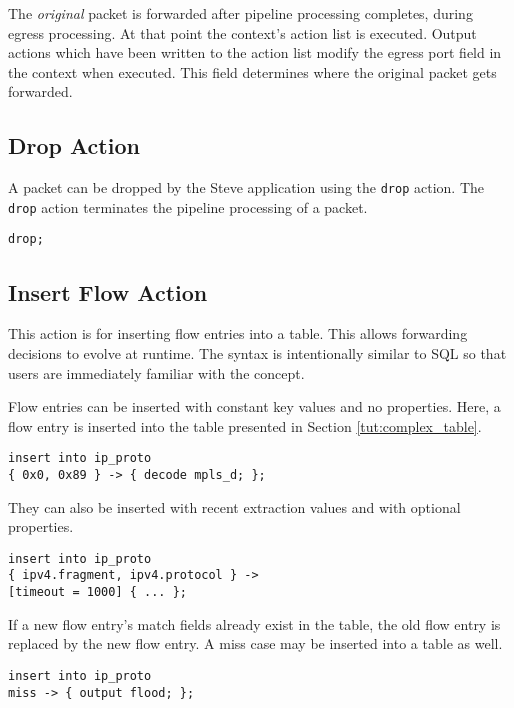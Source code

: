 The \textit{original} packet is forwarded after pipeline processing completes,
during egress processing.
At that point the context's action list is executed.
Output actions which have been written to the action list modify the
egress port field in the context when executed.
This field determines where the original packet gets forwarded.

\subsection{Drop Action} \label{tut:drop_action}

A packet can be dropped by the Steve application using the \texttt{drop} action.
The \texttt{drop} action terminates the pipeline processing of a packet.

\begin{lstlisting}
drop;
\end{lstlisting}

\subsection{Insert Flow Action} \label{tut:insert_flow_action}

This action is for inserting flow entries into a table.
This allows forwarding decisions to evolve at runtime. The syntax is intentionally similar to SQL so that users are immediately familiar with the concept.

Flow entries can be inserted with constant key values and no properties. Here,
a flow entry is inserted into the table presented in Section
\ref{tut:complex_table}.

\begin{lstlisting}
insert into ip_proto
{ 0x0, 0x89 } -> { decode mpls_d; };
\end{lstlisting}

They can also be inserted with recent extraction values and with
optional properties.

\begin{lstlisting}
insert into ip_proto
{ ipv4.fragment, ipv4.protocol } ->
[timeout = 1000] { ... };
\end{lstlisting}

If a new flow entry's match fields already exist in the table, the old flow
entry is replaced by the new flow entry. A miss case may be inserted into a
table as well.

\begin{lstlisting}
insert into ip_proto
miss -> { output flood; };
\end{lstlisting}

